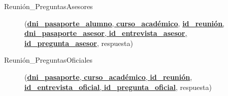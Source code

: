   \begin{description}
    \item[Reunión\_PreguntasAsesores] \begin{flushleft}(\underline{\textbf{dni\_pasaporte\_alumno}, \textbf{curso\_académico},}
    \underline{\textbf{id\_reunión}, \textbf{dni\_pasaporte\_asesor},
    \textbf{id\_entrevista\_asesor},} \underline{\textbf{id\_pregunta\_asesor}},
    respuesta)\end{flushleft}
   \end{description}

  \begin{description}
    \item[Reunión\_PreguntasOficiales] \begin{flushleft}(\underline{\textbf{dni\_pasaporte}, \textbf{curso\_académico},
    \textbf{id\_reunión}}, \underline{\textbf{id\_entrevista\_oficial},
    \textbf{id\_pregunta\_oficial}}, respuesta)\end{flushleft}
  \end{description}
